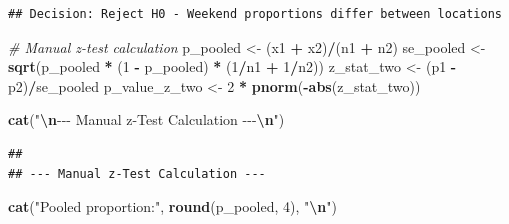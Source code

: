 \documentclass[
  12pt,
]{article}
\newenvironment{Shaded}{\begin{snugshade}}{\end{snugshade}}
\newcommand{\CommentTok}[1]{\textcolor[rgb]{0.56,0.35,0.01}{\textit{#1}}}
\newcommand{\DecValTok}[1]{\textcolor[rgb]{0.00,0.00,0.81}{#1}}
\newcommand{\FunctionTok}[1]{\textcolor[rgb]{0.13,0.29,0.53}{\textbf{#1}}}
\newcommand{\NormalTok}[1]{#1}
\newcommand{\OtherTok}[1]{\textcolor[rgb]{0.56,0.35,0.01}{#1}}
\newcommand{\SpecialCharTok}[1]{\textcolor[rgb]{0.81,0.36,0.00}{\textbf{#1}}}
\newcommand{\StringTok}[1]{\textcolor[rgb]{0.31,0.60,0.02}{#1}}
\begin{document}
\begin{Shaded}
\end{Shaded}

\begin{verbatim}
## Decision: Reject H0 - Weekend proportions differ between locations
\end{verbatim}

\begin{Shaded}
\begin{Highlighting}[]
\CommentTok{\# Manual z{-}test calculation}
\NormalTok{p\_pooled }\OtherTok{\textless{}{-}}\NormalTok{ (x1 }\SpecialCharTok{+}\NormalTok{ x2)}\SpecialCharTok{/}\NormalTok{(n1 }\SpecialCharTok{+}\NormalTok{ n2)}
\NormalTok{se\_pooled }\OtherTok{\textless{}{-}} \FunctionTok{sqrt}\NormalTok{(p\_pooled }\SpecialCharTok{*}\NormalTok{ (}\DecValTok{1} \SpecialCharTok{{-}}\NormalTok{ p\_pooled) }\SpecialCharTok{*}\NormalTok{ (}\DecValTok{1}\SpecialCharTok{/}\NormalTok{n1 }\SpecialCharTok{+} \DecValTok{1}\SpecialCharTok{/}\NormalTok{n2))}
\NormalTok{z\_stat\_two }\OtherTok{\textless{}{-}}\NormalTok{ (p1 }\SpecialCharTok{{-}}\NormalTok{ p2)}\SpecialCharTok{/}\NormalTok{se\_pooled}
\NormalTok{p\_value\_z\_two }\OtherTok{\textless{}{-}} \DecValTok{2} \SpecialCharTok{*} \FunctionTok{pnorm}\NormalTok{(}\SpecialCharTok{{-}}\FunctionTok{abs}\NormalTok{(z\_stat\_two))}

\FunctionTok{cat}\NormalTok{(}\StringTok{"}\SpecialCharTok{\textbackslash{}n}\StringTok{{-}{-}{-} Manual z{-}Test Calculation {-}{-}{-}}\SpecialCharTok{\textbackslash{}n}\StringTok{"}\NormalTok{)}
\end{Highlighting}
\end{Shaded}

\begin{verbatim}
## 
## --- Manual z-Test Calculation ---
\end{verbatim}

\begin{Shaded}
\begin{Highlighting}[]
\FunctionTok{cat}\NormalTok{(}\StringTok{"Pooled proportion:"}\NormalTok{, }\FunctionTok{round}\NormalTok{(p\_pooled, }\DecValTok{4}\NormalTok{), }\StringTok{"}\SpecialCharTok{\textbackslash{}n}\StringTok{"}\NormalTok{)}
\end{Highlighting}
\end{Shaded}
\end{document}
